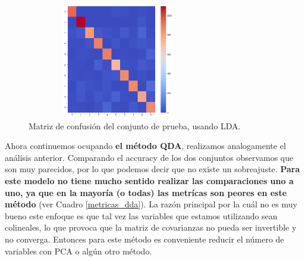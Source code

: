 \documentclass[paper=letter, fontsize=11pt]{scrartcl}
\numberwithin{equation}{section} %
\numberwithin{figure}{section} %
\numberwithin{table}{section} %
\begin{document}
\begin{figure}[H]
    \centering
    \includegraphics[width=8cm, height=5cm]{figure/lda_confusion.png}
    \caption{Matriz de confusión del conjunto de prueba, usando LDA.}
    \label{fig:lda_confusion}
\end{figure}

Ahora continuemos ocupando \textbf{el método QDA}, realizamos analogamente el análisis anterior. Comparando el accuracy de los dos conjuntos observamos que son muy parecidos, por lo que podemos decir que no existe un sobreajuste. \textbf{Para este modelo no tiene mucho sentido realizar las comparaciones uno a uno, ya que en la mayoría (o todas) las metrícas son peores en este método} (ver Cuadro \ref{metricas_dda}). La razón principal por la cuál no es muy bueno este enfoque es que tal vez las variables que estamos utilizando sean colineales, lo que provoca que la matriz de covarianzas no pueda ser invertible y no converga. Entonces para este método es conveniente reducir el número de variables con PCA o algún otro método.
\end{document}
